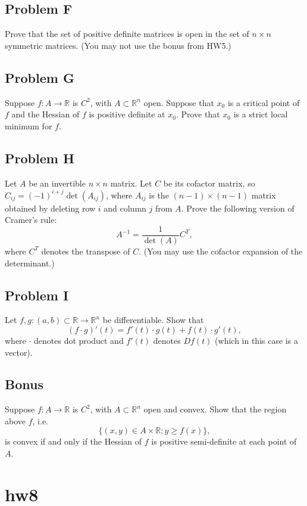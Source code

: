 \documentclass[lang=en,11pt]{template}
\begin{document}
\section*{Problem F}
Prove that the set of positive definite matrices is open in the set of $n \times n$ symmetric matrices. (You may not use the bonus from HW5.)

\section*{Problem G}
Suppose $f : A \to \mathbb{R}$ is $C^2$, with $A \subset \mathbb{R}^n$ open. Suppose that $x_0$ is a critical point of $f$ and the Hessian of $f$ is positive definite at $x_0$. Prove that $x_0$ is a strict local minimum for $f$.

\section*{Problem H}
Let $A$ be an invertible $n \times n$ matrix. Let $C$ be its cofactor matrix, so $C_{ij} = (-1)^{i+j} \det(A_{ij})$, where $A_{ij}$ is the $(n-1) \times (n-1)$ matrix obtained by deleting row $i$ and column $j$ from $A$. Prove the following version of Cramer's rule:
\[
A^{-1} = \frac{1}{\det(A)} C^T,
\]
where $C^T$ denotes the transpose of $C$. (You may use the cofactor expansion of the determinant.)

\section*{Problem I}
Let $f, g : (a, b) \subset \mathbb{R} \to \mathbb{R}^n$ be differentiable. Show that
\[
(f \cdot g)'(t) = f'(t) \cdot g(t) + f(t) \cdot g'(t),
\]
where $\cdot$ denotes dot product and $f'(t)$ denotes $Df(t)$ (which in this case is a vector).

\section*{Bonus}
Suppose $f : A \to \mathbb{R}$ is $C^2$, with $A \subset \mathbb{R}^n$ open and convex. Show that the region above $f$, i.e.
\[
\{(x, y) \in A \times \mathbb{R} : y \geq f(x)\},
\]
is convex if and only if the Hessian of $f$ is positive semi-definite at each point of $A$.




\chapter{hw8}
\end{document}
